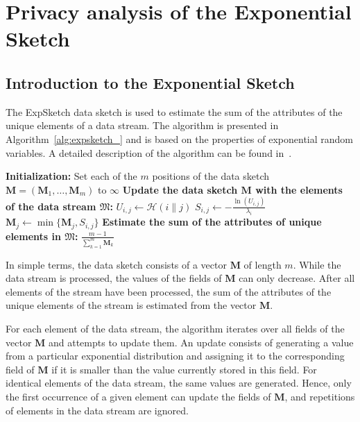 \chapter{Privacy analysis of the Exponential Sketch}
\label{chap:expSketch}

\section{Introduction to the Exponential Sketch}

The ExpSketch data sketch is used to estimate the sum of the attributes of the unique elements of a data stream. The algorithm is presented in Algorithm~\ref{alg:expsketch_} and is based on the properties of exponential random variables. A detailed description of the algorithm can be found in~\cite{On_the_algebra_of_data_sketches}.

\begin{algorithm}[htbp]
\caption{ExpSketch($\mathfrak{M}, m$)}
\label{alg:expsketch_}
\begin{algorithmic}[1]
\State \textbf{Initialization:}
\State Set each of the $m$ positions of the data sketch $\mathbf{M} = (\mathbf{M}_1, \ldots, \mathbf{M}_m)$ to $\infty$
\State
\State \textbf{Update the data sketch $\mathbf{M}$ with the elements of the data stream $\mathfrak{M}$:}
        \State $U_{i,j} \gets \mathcal{H}(i \mathbin{\|} j)$ \Comment{hash $\mathcal{H}(x) \in [0, 1)$} \label{line:generate_uniform_random_value}
        \State $S_{i,j} \gets -\frac{\ln(U_{i,j})}{\lambda_i}$ \label{line:generate_exponential_random_value}
        \State $\mathbf{M}_j \gets \min \{\mathbf{M}_j, S_{i,j}\}$ \label{line:generate_new_exponential_random_value}
    \EndFor
\EndFor
\State
\State \textbf{Estimate the sum of the attributes of unique elements in $\mathfrak{M}$:}
\State \Return $\frac{m-1}{\sum_{k=1}^{m} \mathbf{M}_k}$
\end{algorithmic}
\end{algorithm}

In simple terms, the data sketch consists of a vector $\mathbf{M}$ of length $m$. While the data stream is processed, the values of the fields of $\mathbf{M}$ can only decrease. After all elements of the stream have been processed, the sum of the attributes of the unique elements of the stream is estimated from the vector $\mathbf{M}$.

For each element of the data stream, the algorithm iterates over all fields of the vector $\mathbf{M}$ and attempts to update them. An update consists of generating a value from a particular exponential distribution and assigning it to the corresponding field of $\mathbf{M}$ if it is smaller than the value currently stored in this field. For identical elements of the data stream, the same values are generated. Hence, only the first occurrence of a given element can update the fields of $\mathbf{M}$, and repetitions of elements in the data stream are ignored.

